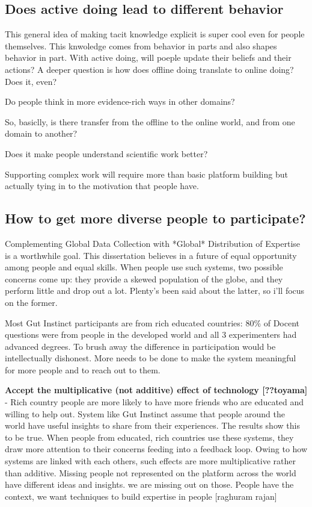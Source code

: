 \subsection{Does active doing lead to different behavior}
This general idea of making tacit knowledge explicit is super cool even for people themselves. This knwoledge comes from behavior in parts and also shapes behavior in part. With active doing, will poeple update their beliefs and their actions? A deeper question is how does offline doing translate to online doing? Does it, even?

Do people think in more evidence-rich ways in other domains?

So, basiclly, is there transfer from the offline to the online world, and from one domain to another?

Does it make people understand scientific work better?

Supporting complex work will require more than basic platform building but actually tying in to the motivation that people have.

\subsection{How to get more diverse people to participate?}

Complementing Global Data Collection with *Global* Distribution of Expertise is a worthwhile goal. This dissertation believes in a future of equal opportunity among people and equal skills. When people use such systems, two possible concerns come up: they provide a skewed population of the globe, and they perform little and drop out a lot. Plenty's been said about the latter, so i'll focus on the former.

Most Gut Instinct participants are from rich educated countries: 80\% of Docent questions were from people in the developed world and all 3 experimenters had advanced degrees. To brush away the difference in participation would be intellectually dishonest. More needs to be done to make the system meaningful for more people and to reach out to them. 

\textbf{Accept the multiplicative (not additive) effect of technology [??toyama]} - Rich country people are more likely to have more friends who are educated and willing to help out. System like Gut Instinct assume that people around the world have useful insights to share from their experiences. The results show this to be true. When people from educated, rich countries use these systems, they draw more attention to their concerns feeding into a feedback loop. Owing to how systems are linked with each others, such effects are more multiplicative rather than additive.  Missing people not represented on the platform across the world have different ideas and insights. we are missing out on those. People have the context, we want techniques to build expertise in people [raghuram rajan]

